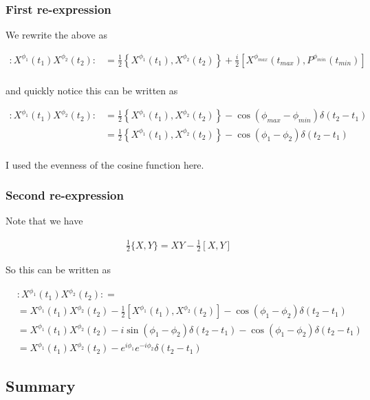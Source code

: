 \documentclass[12pt]{article}
\begin{document}
\subsubsection{First re-expression}
We rewrite the above as

\begin{align}
:X^{\phi_1}(t_1)X^{\phi_2}(t_2): &= \frac{1}{2}\left\{X^{\phi_1}(t_1), X^{\phi_2}(t_2)\right\} + \frac{i}{2}\left[X^{\phi_{max}}(t_{max}), P^{\phi_{min}}(t_{min})\right]\\
\end{align}

and quickly notice this can be written as

\begin{align}
:X^{\phi_1}(t_1)X^{\phi_2}(t_2): &= \frac{1}{2}\left\{X^{\phi_1}(t_1), X^{\phi_2}(t_2)\right\} - \cos(\phi_{max} - \phi_{min})\delta(t_2-t_1)\\
&= \frac{1}{2}\left\{X^{\phi_1}(t_1), X^{\phi_2}(t_2)\right\} - \cos(\phi_1 - \phi_2)\delta(t_2-t_1)\\
\end{align}

I used the evenness of the cosine function here.

\subsubsection{Second re-expression}
Note that we have

\begin{align}
\frac{1}{2}\{X, Y\} = XY - \frac{1}{2}[X,Y]
\end{align}

So this can be written as

\begin{align}
&:X^{\phi_1}(t_1)X^{\phi_2}(t_2): =\\
&= X^{\phi_1}(t_1)X^{\phi_2}(t_2)
-\frac{1}{2}\left[X^{\phi_1}(t_1), X^{\phi_2}(t_2)\right] - \cos(\phi_{1} - \phi_{2})\delta(t_2-t_1)\\
&= X^{\phi_1}(t_1)X^{\phi_2}(t_2) - i\sin(\phi_1 - \phi_2)\delta(t_2-t_1) - \cos(\phi_{1} - \phi_{2})\delta(t_2-t_1)\\
&= X^{\phi_1}(t_1)X^{\phi_2}(t_2) - e^{i\phi_1}e^{-i\phi_2}\delta(t_2-t_1)
\end{align}

\subsection{Summary}
\end{document}
